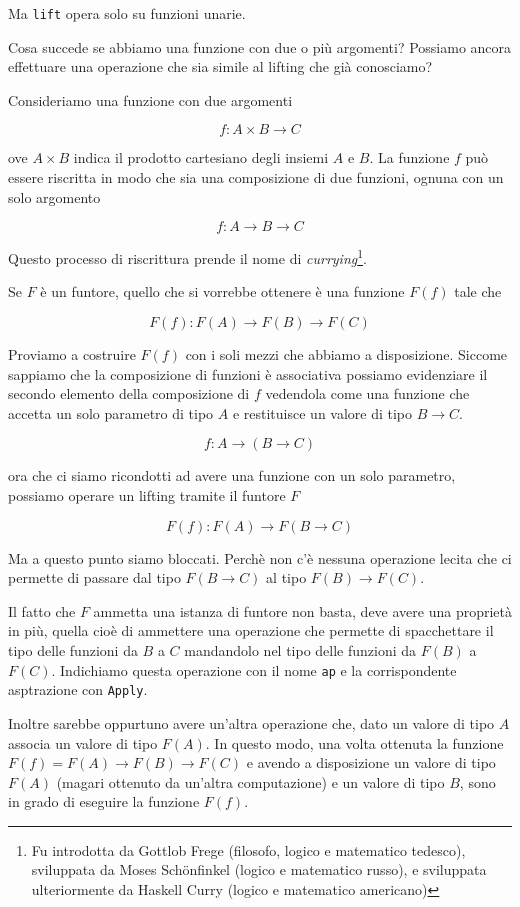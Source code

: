 \documentclass[12pt]{article}
\begin{document}
Ma \texttt{lift} opera solo su funzioni unarie.

Cosa succede se abbiamo una funzione con due o più argomenti?
Possiamo ancora effettuare una operazione che sia simile al lifting che già conosciamo?

Consideriamo una funzione con due argomenti

$$
f: A \times B \rightarrow C
$$

ove $A \times B$ indica il prodotto cartesiano degli insiemi $A$ e $B$.
La funzione $f$ può essere riscritta in modo che sia una composizione di due funzioni, ognuna con un solo argomento

$$
f: A \rightarrow B \rightarrow C
$$

Questo processo di riscrittura prende il nome di \emph{currying}\footnote{Fu introdotta da Gottlob Frege (filosofo, logico e matematico tedesco), sviluppata da Moses Schönfinkel (logico e matematico russo), e sviluppata ulteriormente da Haskell Curry (logico e matematico americano)}.

Se $F$ è un funtore, quello che si vorrebbe ottenere è una funzione $F(f)$ tale che

$$
F(f): F(A) \rightarrow F(B) \rightarrow F(C)
$$

Proviamo a costruire $F(f)$ con i soli mezzi che abbiamo a disposizione.
Siccome sappiamo che la composizione di funzioni è associativa possiamo evidenziare il secondo elemento della composizione di $f$
vedendola come una funzione che accetta un solo parametro di tipo $A$ e restituisce un valore di tipo $B \rightarrow C$.

$$
f: A \rightarrow (B \rightarrow C)
$$

ora che ci siamo ricondotti ad avere una funzione con un solo parametro, possiamo operare un lifting tramite il funtore $F$

$$
F(f): F(A) \rightarrow F(B \rightarrow C)
$$

Ma a questo punto siamo bloccati.
Perchè non c'è nessuna operazione lecita che ci permette di passare dal tipo $F(B \rightarrow C)$ al tipo $F(B) \rightarrow F(C)$.

Il fatto che $F$ ammetta una istanza di funtore non basta, deve avere una proprietà in più, quella cioè di ammettere una operazione che permette di
spacchettare il tipo delle funzioni da $B$ a $C$ mandandolo nel tipo delle funzioni da $F(B)$ a $F(C)$.
Indichiamo questa operazione con il nome \texttt{ap} e la corrispondente asptrazione con \texttt{Apply}.

Inoltre sarebbe oppurtuno avere un'altra operazione che, dato un valore di tipo $A$ associa un valore di tipo $F(A)$.
In questo modo, una volta ottenuta la funzione $F(f) = F(A) \rightarrow F(B) \rightarrow F(C)$ e avendo a disposizione un valore di tipo $F(A)$
(magari ottenuto da un'altra computazione) e un valore di tipo $B$, sono in grado di eseguire la funzione $F(f)$.
\end{document}
